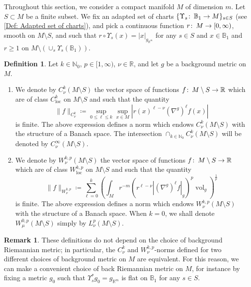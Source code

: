 \documentclass{article}
\numberwithin{equation}{section}        %
\theoremstyle{bfnote}
\theoremstyle{definition}
\newtheorem{Def}[thm]{Definition}           %
\theoremstyle{bfremark}
\newtheorem{rem}[thm]{Remark}               %
\newcommand{\col}{\colon \thinspace}        %
\newcommand{\N}{\mathbb{N}}                 %
\newcommand{\R}{\mathbb{R}}                 %
\newcommand{\Ball}{\mathbb{B}}              %
\DeclareMathOperator{\vol}{vol}                 %
\begin{document}
Throughout this section, we consider a compact manifold $M$ of dimension $m$. Let $S \subset M$ be a finite subset. We fix an adapted set of charts $\{\Upsilon_s \col \Ball_1 \to M\}_{s \in S}$ (see \cref{Def: Adapted set of charts}), and pick a continuous function  $r \col M \rightarrow [0,\infty)$, smooth on $M \setminus S$, and such that $r \circ \Upsilon_s(x) = |x|_{g_{\R^m}}$ for any $s \in S$ and $x \in \Ball_1$ and $r \geq 1$ on $M \setminus (\cup_s \Upsilon_s(\Ball_1))$.

\begin{Def}
    Let $k \in \N_0$, $p \in [1,\infty)$, $\nu \in \R$, and let $g$ be a background metric on $M$. 
    
    \begin{enumerate}
    	
		\item We denote by $C^{k}_\nu(M \setminus S)$ the vector space of functions $f \col M \setminus S \rightarrow \R$ which are of class $C^{k}_{\mathrm{loc}}$ on $M \setminus S$ and such that the quantity
        \begin{equation*}
            \|f\|_{C^{k}_\nu} \coloneqq \sup_{0 \leq \ell \leq k} \sup_{x \in M} |r(x)^{\ell-\nu} (\nabla^{g})^\ell f(x)|
        \end{equation*}
        is finite. The above expression defines a norm which endows $C^{k}_\nu(M \setminus S)$ with the structure of a Banach space. The intersection $\cap_{k \in \N_0} C^{k}_\nu(M \setminus S)$ will be denoted by $C^\infty_\nu(M \setminus S)$.
    
    	\item We denote by $W^{k,p}_\nu(M \setminus S)$ the vector space of functions $f \col M \setminus S \rightarrow \R$ which are of class $W^{k,p}_{\mathrm{loc}}$ on $M \setminus S$ and such that the quantity
    \begin{equation*}
        \|f\|_{W^{k,p}_\nu} \coloneqq \sum_{\ell = 0}^k \left( \int_M r^{-m} (r^{\ell-\nu} |(\nabla^g)^\ell f|_g)^p \vol_g \right)^{\frac{1}{p}}
    \end{equation*}
    is finite. The above expression defines a norm which endows $W^{k,p}_\nu(M \setminus S)$ with the structure of a Banach space. When $k = 0$, we shall denote $W^{0,p}_\mu(M \setminus S)$ simply by $L^p_\nu(M \setminus S)$.
	\end{enumerate}
\end{Def}

\begin{rem}
    These definitions do not depend on the choice of background Riemannian metric; in particular, the $C^{k}_\nu$ and $W^{k,p}_\nu$-norms defined for two different choices of background metric on $M$ are equivalent. For this reason, we can make a convenient choice of back Riemannian metric on $M$, for instance by fixing a metric $g_0$ such that $\Upsilon_s^* g_0 = g_{\R^m}$ is flat on $\Ball_1$ for any $s \in S$.
\end{rem}
\end{document}
